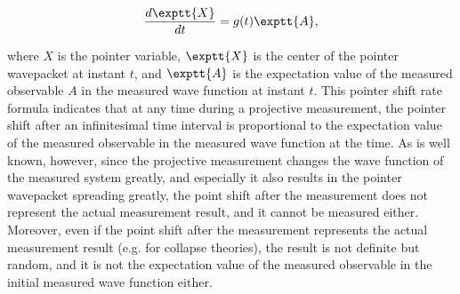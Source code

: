 \begin{equation}
{d\exptt{X} \over dt} = g(t)\exptt{A},
\end{equation}

\noindent where $X$ is the pointer variable, $\exptt{X}$ is the center of the pointer wavepacket at instant $t$, and $\exptt{A}$ is the expectation value of the measured observable $A$ in the measured wave function at instant $t$.  
This pointer shift rate formula indicates that at any time during a projective measurement, the pointer shift after an infinitesimal time interval is proportional to the expectation value of the measured observable in the measured wave function at the time.  
As is well known, however, since the projective measurement changes the wave function of the measured system greatly, and especially it also results in the pointer wavepacket spreading greatly, the point shift after the measurement does not represent the actual measurement result, and it cannot be measured either. 
Moreover, even if the point shift after the measurement represents the actual measurement result (e.g. for collapse theories), the result is not definite but random, and it is not the expectation value of the measured observable in the initial measured wave function either. 

